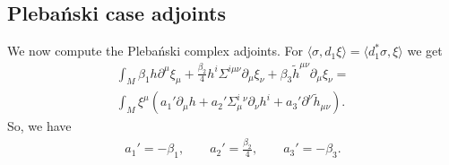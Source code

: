 \documentclass[10pt]{report}
\newcommand{\pleb}[0]{Pleba\'nski}
\theoremstyle{definition}
\begin{document}
\subsection{\pleb{} case adjoints}
We now compute the \pleb{} complex adjoints. For $\langle \sigma, d_1 \xi\rangle = \langle d_1^* \sigma, \xi\rangle$ we get
\begin{align}
\int_M \beta_1 h \partial^\mu \xi_\mu + \frac{\beta_2}{4}  h^i \Sigma^{i\mu\nu} \partial_\mu \xi_\nu + \beta_3  \tilde{h}^{\mu\nu} \partial_\mu \xi_\nu =\\ \nonumber
\int_M \xi^\mu (a_1' \partial_\mu h + a_2' \Sigma^i_\mu{}^\nu \partial_\nu h^i + a_3' \partial^\nu \tilde{h}_{\mu\nu}).
\end{align}
So, we have
\begin{align}
a_1'= -\beta_1 , \qquad  a_2'= \frac{\beta_2}{4} , \qquad a_3'= - \beta_3.
\end{align}
\end{document}
